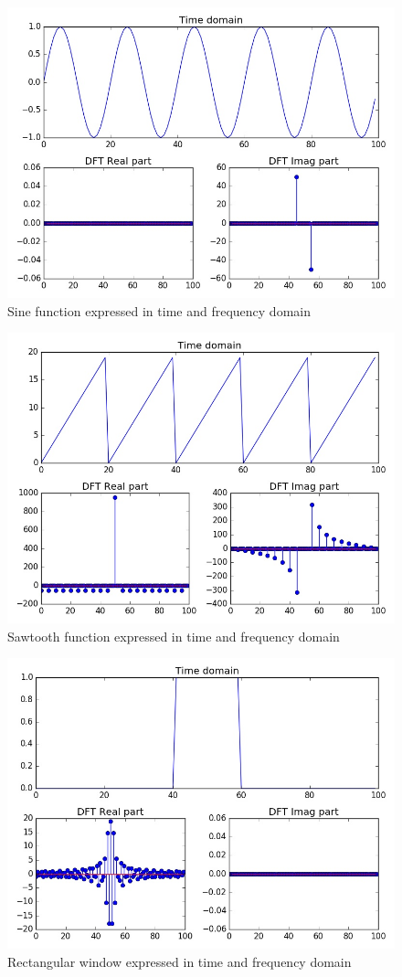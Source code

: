 \documentclass[magister]{dyplom}
\begin{document}
	\begin{figure}[!th]
		\centering
		\includegraphics[width=0.7\linewidth]{images/sine}
		\caption{Sine function expressed in time and frequency domain}
		\label{fig:sine}
	\end{figure}

	\begin{figure}[!th]
		\centering
		\includegraphics[width=0.7\linewidth]{images/saw}
		\caption{Sawtooth function expressed in time and frequency domain}
		\label{fig:saw}
	\end{figure}

	\begin{figure}[!th]
		\centering
		\includegraphics[width=0.7\linewidth]{images/rect_window}
		\caption{Rectangular window expressed in time and frequency domain}
		\label{fig:rect_window}
	\end{figure}
\end{document}
